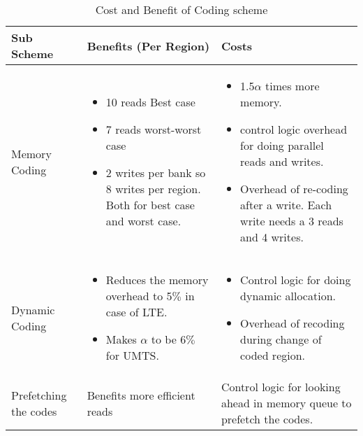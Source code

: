 \begin{table}[ht!]
    \begin{tabular}{ | p{2cm} | p{7.5cm} | p{7.5cm} |}
    \hline
    Sub Scheme & Benefits (Per Region) & Costs \\ \hline
    Memory Coding &
    \vspace{-7mm}  
    \begin{itemize} 
    \item 10 reads Best case 
    \item 7 reads worst-worst case
    \item 2 writes per bank so 8 writes per region. Both for best case and worst case.
    \end{itemize}
    & 
    \vspace{-7mm} 
    \begin{itemize} 
    \item 1.5$\alpha$ times more memory.  
    \item control logic overhead for doing parallel reads and writes.
    \item Overhead of re-coding after a write. Each write needs a 3 reads and 4 writes.  
    \end{itemize}
 \\ \hline
    Dynamic Coding & 
    \vspace{-7mm} 
    \begin{itemize}
    \item Reduces the memory overhead to 5$\%$ in case of LTE. 
    \item Makes $\alpha$ to be 6$\%$ for UMTS. 
    \end{itemize}
    & 
    \vspace{-7mm} 
    \begin{itemize}
    \item Control logic for doing dynamic allocation. 
    \item Overhead of recoding during change of coded region. 
    \end{itemize}
 \\ \hline 
    Prefetching the codes & 
    Benefits more efficient reads & 
    Control logic for looking ahead in memory queue to prefetch the codes. 
 \\ \hline
    \end{tabular}
    \caption{Cost and Benefit of Coding scheme}
    \label{table:benefit_cost}
\end{table}
\\

